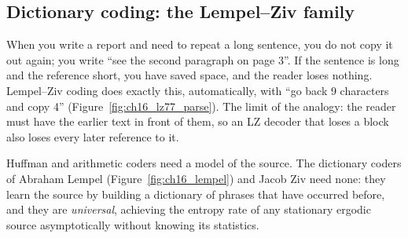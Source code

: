 \subsection{Dictionary coding: the Lempel--Ziv family}
\label{sec:ch16:lz}


\begin{analogy}
When you write a report and need to repeat a long sentence, you do not copy it out again; you
write ``see the second paragraph on page 3''. If the sentence is long and the reference short,
you have saved space, and the reader loses nothing. Lempel--Ziv coding does exactly this,
automatically, with ``go back 9 characters and copy 4'' (Figure~\ref{fig:ch16_lz77_parse}). The
limit of the analogy: the reader must have the earlier text in front of them, so an LZ decoder
that loses a block also loses every later reference to it.
\end{analogy}


Huffman and arithmetic coders need a model of the source. The dictionary coders of Abraham Lempel (Figure~\ref{fig:ch16_lempel})
and Jacob Ziv need none: they learn the source by building a dictionary of phrases that have
occurred before, and they are \emph{universal}, achieving the entropy rate of any stationary
ergodic source asymptotically without knowing its statistics.

